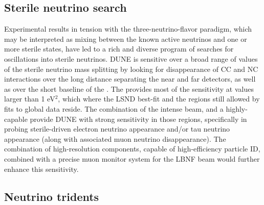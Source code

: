 \subsection{Sterile neutrino search}
\label{ssec:exsum-nd-BSMappendix-sterileneutrinos}

Experimental results in tension with the three-neutrino-flavor paradigm, which may be interpreted as mixing between the known active neutrinos and one or more sterile states, have led to a rich and diverse program of searches for oscillations into sterile neutrinos.  DUNE is sensitive over a broad range of values of the sterile neutrino mass splitting by looking for disappearance of CC and NC interactions over the long distance separating the near and far detectors, as well as over the short baseline of the . The  provides most of the sensitivity at values larger than 1 eV$^{2}$, which where the LSND best-fit and the regions still allowed by fits to global data reside. The combination of the intense  beam, and a highly-capable  provide DUNE with strong sensitivity in those regions, specifically in probing sterile-driven electron neutrino appearance and/or tau neutrino appearance (along with associated muon neutrino disappearance). The combination of high-resolution  components, capable of high-efficiency particle ID, combined with a precise muon monitor system for the LBNF beam would further enhance this sensitivity. 

\subsection{Neutrino tridents}
\label{ssec:exsum-nd-BSMappendix-tridents}


